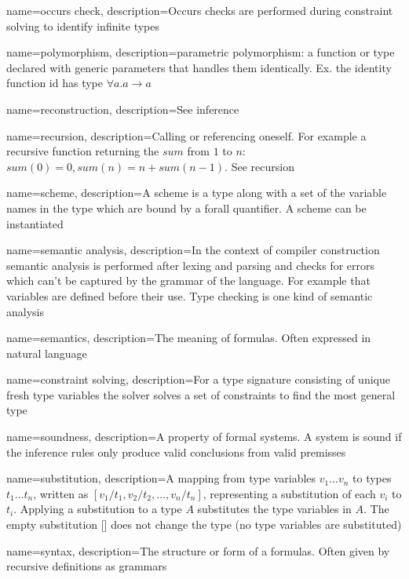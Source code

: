 { name={occurs check},
  description={Occurs checks are performed during constraint solving to identify infinite types}
}

{ name={polymorphism},
  description={parametric polymorphism: a function or type declared with generic parameters that handles them identically. Ex. the identity function id has type $\forall a . a \to a$}
}

{ name={reconstruction},
  description={See inference}
}

{ name={recursion},
  description={Calling or referencing oneself. For example a recursive function returning the $sum$ from $1$ to $n$: $sum(0) = 0, sum(n) = n + sum(n-1)$.
See recursion}
}

{ name={scheme},
  description={A scheme is a type along with a set of the variable names in the type which are bound by a forall quantifier. A scheme can be instantiated}
}

{ name={semantic analysis},
  description={In the context of compiler construction semantic analysis is performed after lexing and parsing and checks for errors which can't be captured by the grammar of the language. For example that variables are defined before their use. Type checking is one kind of semantic analysis}
}

{ name={semantics},
  description={The meaning of formulas. Often expressed in natural language}
}

{ name={constraint solving},
  description={For a type signature consisting of unique fresh type variables the solver solves a set of constraints to find the most general type}
}

{ name={soundness},
  description={A property of formal systems. A system is sound if the inference rules only produce valid conclusions from valid premisses}
} %

{ name={substitution},
  description={A mapping from type variables $v_1...v_n$ to types $t_1...t_n$, written as $[v_1/t_1,v_2/t_2,...,v_n/t_n]$, representing a substitution of each $v_i$ to $t_i$. Applying a substitution to a type $A$ substitutes the type variables in $A$. The empty substitution [] does not change the type (no type variables are substituted)}
}

{ name={syntax},
  description={The structure or form of a formulas. Often given by recursive definitions as grammars}
}

